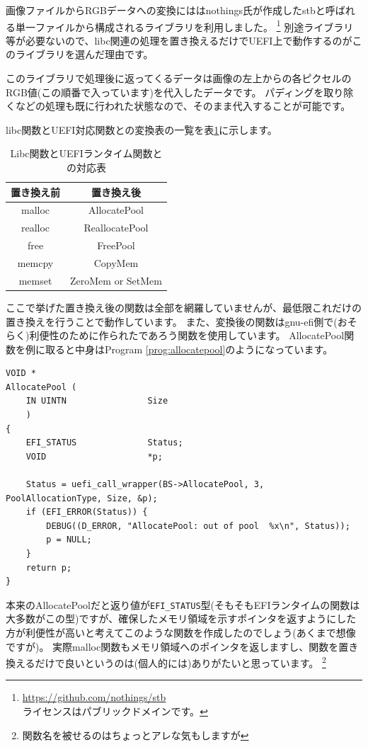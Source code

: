 \documentclass[10pt,b5paper,twoside,openany]{ltjsbook}
\begin{document}
画像ファイルからRGBデータへの変換にははnothings氏が作成したstbと呼ばれる単一ファイルから構成されるライブラリを利用しました。
\footnote{\url{https://github.com/nothings/stb} \\ ライセンスはパブリックドメインです。}
別途ライブラリ等が必要ないので、libc関連の処理を置き換えるだけでUEFI上で動作するのがこのライブラリを選んだ理由です。

このライブラリで処理後に返ってくるデータは画像の左上からの各ピクセルのRGB値(この順番で入っています)を代入したデータです。
パディングを取り除くなどの処理も既に行われた状態なので、そのまま代入することが可能です。

libc関数とUEFI対応関数との変換表の一覧を表\ref{tb:function}に示します。
\begin{table}[H]
    \centering
    \caption{Libc関数とUEFIランタイム関数との対応表}
    \begin{tabular}{|c|c|}
        \hline
        置き換え前 & 置き換え後 \\
        \hline
        malloc & AllocatePool \\
        realloc & ReallocatePool \\
        free & FreePool \\
        memcpy & CopyMem \\
        memset & ZeroMem or SetMem \\
        \hline
    \end{tabular}
    \label{tb:function}
\end{table}
ここで挙げた置き換え後の関数は全部を網羅していませんが、最低限これだけの置き換えを行うことで動作しています。
また、変換後の関数はgnu-efi側で(おそらく)利便性のために作られたであろう関数を使用しています。
AllocatePool関数を例に取ると中身はProgram \ref{prog:allocatepool}のようになっています。
\begin{lstlisting}[style=customC,caption=AllocatePool function,label=prog:allocatepool]
VOID *
AllocatePool (
    IN UINTN                Size
    )
{
    EFI_STATUS              Status;
    VOID                    *p;

    Status = uefi_call_wrapper(BS->AllocatePool, 3, PoolAllocationType, Size, &p);
    if (EFI_ERROR(Status)) {
        DEBUG((D_ERROR, "AllocatePool: out of pool  %x\n", Status));
        p = NULL;
    }
    return p;
}
\end{lstlisting}
本来のAllocatePoolだと返り値が\verb+EFI_STATUS+型(そもそもEFIランタイムの関数は大多数がこの型)ですが、確保したメモリ領域を示すポインタを返すようにした方が利便性が高いと考えてこのような関数を作成したのでしょう(あくまで想像ですが)。
実際malloc関数もメモリ領域へのポインタを返しますし、関数を置き換えるだけで良いというのは(個人的には)ありがたいと思っています。
\footnote{関数名を被せるのはちょっとアレな気もしますが}
\end{document}
